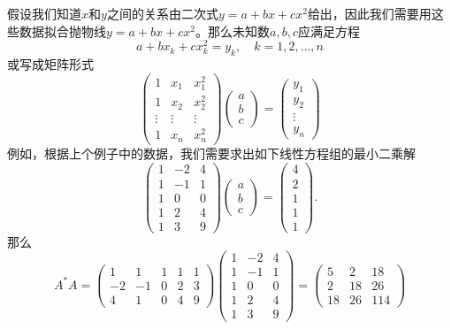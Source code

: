 假设我们知道$x$和$y$之间的关系由二次式$y=a+bx+cx^2$给出，因此我们需要用这些数据拟合抛物线$y=a+bx+cx^2$。那么未知数$a,b,c$应满足方程
$$a+bx_k+cx_k^2=y_k,\quad k=1,2,\ldots,n$$
或写成矩阵形式
$$\left(\begin{array}{ccc}1&x_1&x_1^2\\1&x_2&x_2^2\\\vdots&\vdots&\vdots\\1&x_n&x_n^2\end{array}\right)\left(\begin{array}{c}a\\b\\c\end{array}\right)=\left(\begin{array}{c}y_1\\y_2\\\vdots\\y_n\end{array}\right)$$
例如，根据上个例子中的数据，我们需要求出如下线性方程组的最小二乘解
$$\left(\begin{array}{ccc}1&-2&4\\1&-1&1\\1&0&0\\1&2&4\\1&3&9\end{array}\right)\left(\begin{array}{c}a\\b\\c\end{array}\right)=\left(\begin{array}{c}4\\2\\1\\1\\1\end{array}\right).$$
那么
\[A^*A=\left(\begin{array}{ccccc}1&1&1&1&1\\-2&-1&0&2&3\\4&1&0&4&9\end{array}\right)\left(\begin{array}{ccc}1&-2&4\\1&-1&1\\1&0&0\\1&2&4\\1&3&9\end{array}\right)=\left(\begin{array}{ccc}5&2&18\\2&18&26\\18&26&114\end{array}\right)\]
